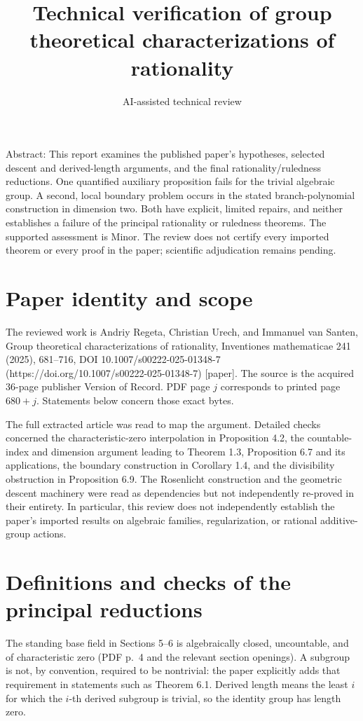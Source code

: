 \documentclass[10pt]{article}
\title{Technical verification of group theoretical characterizations of rationality}
\author{AI-assisted technical review}
\date{}
\begin{document}
\maketitle
Abstract: This report examines the published paper’s hypotheses, selected descent and derived-length arguments, and the final rationality/ruledness reductions. One quantified auxiliary proposition fails for the trivial algebraic group. A second, local boundary problem occurs in the stated branch-polynomial construction in dimension two. Both have explicit, limited repairs, and neither establishes a failure of the principal rationality or ruledness theorems. The supported assessment is Minor. The review does not certify every imported theorem or every proof in the paper; scientific adjudication remains pending.\par
\section*{Paper identity and scope}
The reviewed work is Andriy Regeta, Christian Urech, and Immanuel van Santen, Group theoretical characterizations of rationality, Inventiones mathematicae 241 (2025), 681–716, DOI 10.1007/s00222-025-01348-7 (https://doi.org/10.1007/s00222-025-01348-7) [paper]. The source is the acquired 36-page publisher Version of Record. PDF page \(j\) corresponds to printed page \(680+j\). Statements below concern those exact bytes.\par
The full extracted article was read to map the argument. Detailed checks concerned the characteristic-zero interpolation in Proposition 4.2, the countable-index and dimension argument leading to Theorem 1.3, Proposition 6.7 and its applications, the boundary construction in Corollary 1.4, and the divisibility obstruction in Proposition 6.9. The Rosenlicht construction and the geometric descent machinery were read as dependencies but not independently re-proved in their entirety. In particular, this review does not independently establish the paper’s imported results on algebraic families, regularization, or rational additive-group actions.\par
\section*{Definitions and checks of the principal reductions}
The standing base field in Sections 5–6 is algebraically closed, uncountable, and of characteristic zero (PDF p. 4 and the relevant section openings). A subgroup is not, by convention, required to be nontrivial: the paper explicitly adds that requirement in statements such as Theorem 6.1. Derived length means the least \(i\) for which the \(i\)-th derived subgroup is trivial, so the identity group has length zero.\par
\end{document}
